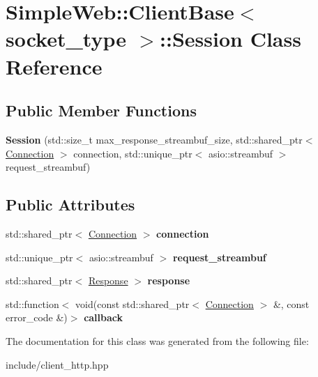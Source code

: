 \hypertarget{classSimpleWeb_1_1ClientBase_1_1Session}{}\section{Simple\+Web\+:\+:Client\+Base$<$ socket\+\_\+type $>$\+:\+:Session Class Reference}
\label{classSimpleWeb_1_1ClientBase_1_1Session}
\subsection*{Public Member Functions}
\begin{DoxyCompactItemize}
\item 
{\bfseries Session} (std\+::size\+\_\+t max\+\_\+response\+\_\+streambuf\+\_\+size, std\+::shared\+\_\+ptr$<$ \hyperlink{classSimpleWeb_1_1ClientBase_1_1Connection}{Connection} $>$ connection, std\+::unique\+\_\+ptr$<$ asio\+::streambuf $>$ request\+\_\+streambuf)\hypertarget{classSimpleWeb_1_1ClientBase_1_1Session_a67fd4c3c3d8de6844b653db4aaba8407}{}\label{classSimpleWeb_1_1ClientBase_1_1Session_a67fd4c3c3d8de6844b653db4aaba8407}

\end{DoxyCompactItemize}
\subsection*{Public Attributes}
\begin{DoxyCompactItemize}
\item 
std\+::shared\+\_\+ptr$<$ \hyperlink{classSimpleWeb_1_1ClientBase_1_1Connection}{Connection} $>$ {\bfseries connection}\hypertarget{classSimpleWeb_1_1ClientBase_1_1Session_a2ca0b0e7d6941dcb8529a6d3da8253a1}{}\label{classSimpleWeb_1_1ClientBase_1_1Session_a2ca0b0e7d6941dcb8529a6d3da8253a1}

\item 
std\+::unique\+\_\+ptr$<$ asio\+::streambuf $>$ {\bfseries request\+\_\+streambuf}\hypertarget{classSimpleWeb_1_1ClientBase_1_1Session_a1e3eddd0b2ac01750cf0ab24912e9eae}{}\label{classSimpleWeb_1_1ClientBase_1_1Session_a1e3eddd0b2ac01750cf0ab24912e9eae}

\item 
std\+::shared\+\_\+ptr$<$ \hyperlink{classSimpleWeb_1_1ClientBase_1_1Response}{Response} $>$ {\bfseries response}\hypertarget{classSimpleWeb_1_1ClientBase_1_1Session_ac18bc6dcdb54d891d47083a34d1d4908}{}\label{classSimpleWeb_1_1ClientBase_1_1Session_ac18bc6dcdb54d891d47083a34d1d4908}

\item 
std\+::function$<$ void(const std\+::shared\+\_\+ptr$<$ \hyperlink{classSimpleWeb_1_1ClientBase_1_1Connection}{Connection} $>$ \&, const error\+\_\+code \&)$>$ {\bfseries callback}\hypertarget{classSimpleWeb_1_1ClientBase_1_1Session_aeaa0947361b2e616c3cf4b5ef6feac80}{}\label{classSimpleWeb_1_1ClientBase_1_1Session_aeaa0947361b2e616c3cf4b5ef6feac80}

\end{DoxyCompactItemize}


The documentation for this class was generated from the following file\+:\begin{DoxyCompactItemize}
\item 
include/client\+\_\+http.\+hpp\end{DoxyCompactItemize}
